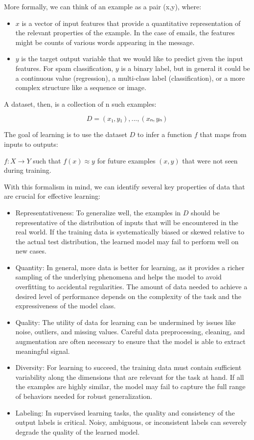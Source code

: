 \documentclass[
  9pt,
  letterpaper,
  abstract,
  titlepage]{scrbook}
\begin{document}
More formally, we can think of an example as a pair (x,y), where:

\begin{itemize}
\item
  \(x\) is a vector of input features that provide a quantitative
  representation of the relevant properties of the example. In the case
  of emails, the features might be counts of various words appearing in
  the message.
\item
  \(y\) is the target output variable that we would like to predict
  given the input features. For spam classification, \(y\) is a binary
  label, but in general it could be a continuous value (regression), a
  multi-class label (classification), or a more complex structure like a
  sequence or image.
\end{itemize}

A dataset, then, is a collection of n such examples:

\[D = {(x₁, y₁), ..., (xₙ, yₙ)}\]

The goal of learning is to use the dataset \(D\) to infer a function
\(f\) that maps from inputs to outputs:

\(f: X → Y\) such that \(f(x) ≈ y\) for future examples \((x,y)\) that
were not seen during training.

With this formalism in mind, we can identify several key properties of
data that are crucial for effective learning:

\begin{itemize}
\item
  Representativeness: To generalize well, the examples in \(D\) should
  be representative of the distribution of inputs that will be
  encountered in the real world. If the training data is systematically
  biased or skewed relative to the actual test distribution, the learned
  model may fail to perform well on new cases.
\item
  Quantity: In general, more data is better for learning, as it provides
  a richer sampling of the underlying phenomena and helps the model to
  avoid overfitting to accidental regularities. The amount of data
  needed to achieve a desired level of performance depends on the
  complexity of the task and the expressiveness of the model class.
\item
  Quality: The utility of data for learning can be undermined by issues
  like noise, outliers, and missing values. Careful data preprocessing,
  cleaning, and augmentation are often necessary to ensure that the
  model is able to extract meaningful signal.
\item
  Diversity: For learning to succeed, the training data must contain
  sufficient variability along the dimensions that are relevant for the
  task at hand. If all the examples are highly similar, the model may
  fail to capture the full range of behaviors needed for robust
  generalization.
\item
  Labeling: In supervised learning tasks, the quality and consistency of
  the output labels is critical. Noisy, ambiguous, or inconsistent
  labels can severely degrade the quality of the learned model.
\end{itemize}
\end{document}
